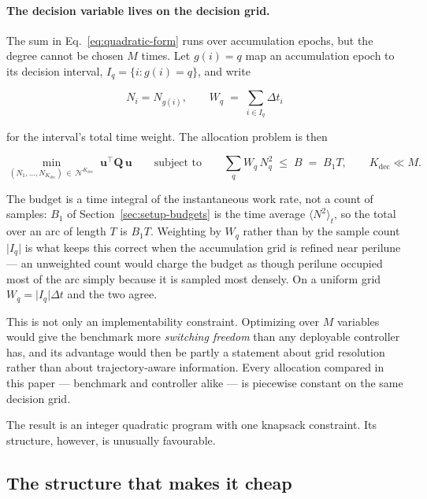 \paragraph{The decision variable lives on the decision grid.} The sum in
Eq.~\eqref{eq:quadratic-form} runs over accumulation epochs, but the degree
cannot be chosen $M$ times. Let $g(i)=q$ map an accumulation epoch to its
decision interval, $I_q=\{i: g(i)=q\}$, and write

\begin{equation}
  N_i = N_{g(i)} ,
  \qquad
  W_q \;=\; \sum_{i\in I_q}\Delta t_i
  \label{eq:interval-weight}
\end{equation}

for the interval's total time weight. The allocation problem is then

\begin{equation}
  \min_{(N_1,\dots,N_{K_{\mathrm{dec}}}) \,\in\, \mathcal{N}^{K_{\mathrm{dec}}}}
  \; \mathbf u^{\top}\mathbf Q\,\mathbf u
  \qquad \text{subject to} \qquad
  \sum_q W_q\,N_q^2 \;\le\; B \;=\; B_1 T ,
  \qquad K_{\mathrm{dec}} \ll M .
  \label{eq:allocation}
\end{equation}

The budget is a time integral of the instantaneous work rate, not a count of
samples: $B_1$ of Section~\ref{sec:setup-budgets} is the time average
$\langle N^2\rangle_t$, so the total over an arc of length $T$ is $B_1T$. Weighting by $W_q$ rather than by
the sample count $\lvert I_q\rvert$ is what keeps this correct when the
accumulation grid is refined near perilune --- an unweighted count would charge
the budget as though perilune occupied most of the arc simply because it is
sampled most densely. On a uniform grid $W_q=\lvert I_q\rvert\Delta t$ and the
two agree.

This is not only an implementability constraint. Optimizing over $M$ variables
would give the benchmark more \emph{switching freedom} than any deployable
controller has, and its advantage would then be partly a statement about grid
resolution rather than about trajectory-aware information. Every allocation
compared in this paper --- benchmark and controller alike --- is piecewise
constant on the same decision grid.

The result is an integer quadratic program with one knapsack constraint. Its
structure, however, is unusually favourable.

\subsection{The structure that makes it cheap}
\label{sec:problem-structure}

